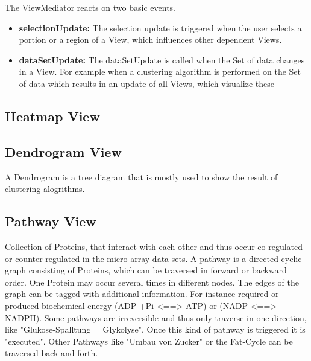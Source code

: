 The ViewMediator reacts on two basic events.
\begin{itemize}
\item \textbf{selectionUpdate: } The selection update is triggered when the user selects a portion or a region of a View, which influences other dependent Views.
\item \textbf{dataSetUpdate: } The dataSetUpdate is called when the Set of data changes in a View. For example when a clustering algorithm is performed on the Set of data which results in an update of all Views, which visualize these 
\end{itemize}

\subsection{Heatmap View}

\subsection{Dendrogram View}

A Dendrogram is a tree diagram that is mostly used to show the result of clustering alogrithms.

\subsection{Pathway View}

\label{msec:pathway_description}

Collection of Proteins, that interact with each other and thus occur co-regulated or counter-regulated in the micro-array data-sets. A pathway is a directed cyclic graph consisting of Proteins, which can be traversed in forward or backward order. One Protein may occur several times in different nodes. The edges of the graph can be tagged with additional information. For instance required or produced biochemical energy (ADP +Pi  <==> ATP) or (NADP <==> NADPH). Some pathways are irreversible and thus only traverse in one direction, like "Glukose-Spalltung = Glykolyse". Once this kind of pathway is triggered it is "executed". Other Pathways like "Umbau von Zucker" or the Fat-Cycle can be traversed back and forth.

